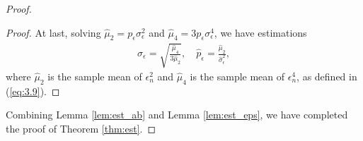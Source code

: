 \begin{proof}
\begin{proof}
    At last, solving $\hat\mu_2=p_\epsilon\sigma_\epsilon^2$ and $\hat\mu_4=3p_\epsilon\sigma_\epsilon^4$, we have estimations \begin{gather*}
    \hat\sigma_\epsilon=\sqrt{\frac{\hat\mu_4}{3\hat\mu_2}}, \quad \hat p_\epsilon=\frac{\hat\mu_2}{\hat\sigma_\epsilon^2},
\end{gather*} where $\hat\mu_2$ is the sample mean of $\epsilon_n^2$ and $\hat\mu_4$ is the sample mean of $\epsilon_n^4$, as defined in (\ref{eq:3.9}). 
\end{proof}

Combining Lemma \ref{lem:est_ab} and Lemma \ref{lem:est_eps}, we have completed the proof of Theorem \ref{thm:est}.
    
\end{proof}
